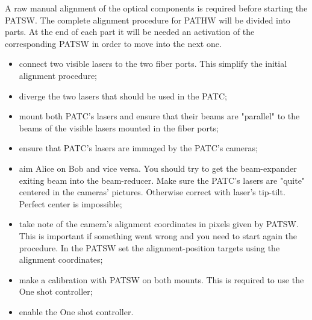 A raw manual alignment of the optical components is required before starting the PATSW.
The complete alignment procedure for PATHW will be divided into parts. At the end of each part it will be needed an activation of the corresponding PATSW in order to move into the next one.

\begin{itemize}
  \item connect two visible lasers to the two fiber ports. This simplify the initial alignment procedure;
  \item diverge the two lasers that should be used in the PATC;
  \item mount both PATC's lasers and ensure that their beams are "parallel" to the beams of the visible lasers mounted in the fiber ports;
  \item ensure that PATC's lasers are immaged by the PATC's cameras;
  \item aim Alice on Bob and vice versa. You should try to get the beam-expander exiting beam into the beam-reducer. Make sure the PATC's lasers are "quite" centered in the cameras' pictures. Otherwise correct with laser's tip-tilt. Perfect center is impossible;
  \item take note of the camera's alignment coordinates in pixels given by PATSW. This is important if something went wrong and you need to start again the procedure. In the PATSW set the alignment-position targets using the alignment coordinates;
  \item make a calibration with PATSW on both mounts. This is required to use the One shot controller;
  \item enable the One shot controller.
\end{itemize}

